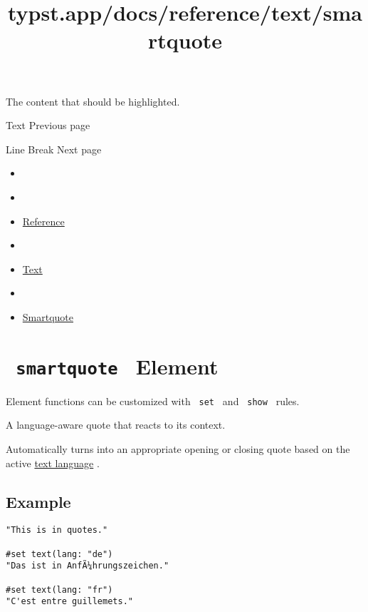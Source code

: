 The content that should be highlighted.

\href{/docs/reference/text/}{\pandocbounded{}}

{ Text } { Previous page }

\href{/docs/reference/text/linebreak/}{\pandocbounded{}}

{ Line Break } { Next page }


\title{typst.app/docs/reference/text/smartquote}

\begin{itemize}
\tightlist
\item
  \href{/docs}{}
\item
  
\item
  \href{/docs/reference/}{Reference}
\item
  
\item
  \href{/docs/reference/text/}{Text}
\item
  
\item
  \href{/docs/reference/text/smartquote/}{Smartquote}
\end{itemize}

\section{\texorpdfstring{\texttt{\ smartquote\ } {{ Element
}}}{ smartquote   Element }}\label{summary}

\label{element-tooltip}
Element functions can be customized with \texttt{\ set\ } and
\texttt{\ show\ } rules.

A language-aware quote that reacts to its context.

Automatically turns into an appropriate opening or closing quote based
on the active \href{/docs/reference/text/text/\#parameters-lang}{text
language} .

\subsection{Example}\label{example}

\begin{verbatim}
"This is in quotes."

#set text(lang: "de")
"Das ist in AnfÃ¼hrungszeichen."

#set text(lang: "fr")
"C'est entre guillemets."
\end{verbatim}

